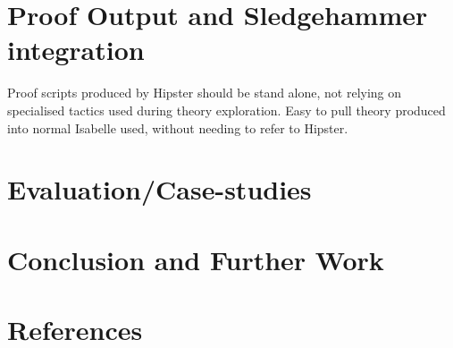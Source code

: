 \documentclass{elsarticle}
\begin{document}
\section{Proof Output and Sledgehammer integration}
Proof scripts produced by Hipster should be stand alone, not relying on specialised tactics used during theory exploration. Easy to pull theory produced into normal Isabelle used, without needing to refer to Hipster.

\section{Evaluation/Case-studies}

\section{Conclusion and Further Work}

\section*{References}


\end{document}
